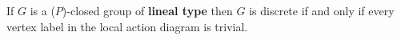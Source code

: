 \documentclass[preview]{standalone}
\begin{document}
\begin{center}
If $G$ is a ($P$)-closed group of \textbf{lineal type} then $G$ is discrete if and only if every vertex label in the local action diagram is trivial.
\end{center}
\end{document}
